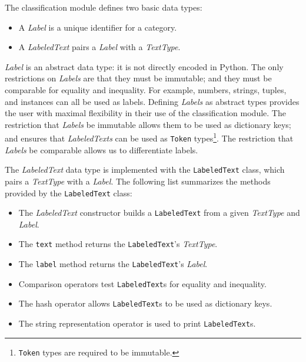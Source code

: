 \documentclass[12pt]{article}
\begin{document}
    The classification module defines two basic data types:

    \begin{itemize}

      \item A \textit{Label} is a unique identifier for a category.

      \item A \textit{LabeledText} pairs a \textit{Label} with a
      \textit{TextType}.

    \end{itemize}

    \textit{Label} is an abstract data type: it is not directly
    encoded in Python.  The only restrictions on \textit{Labels} are
    that they must be immutable; and they must be comparable for
    equality and inequality.  For example, numbers, strings, tuples,
    and instances can all be used as labels.  Defining \textit{Labels}
    as abstract types provides the user with maximal flexibility in
    their use of the classification module.  The restriction that
    \textit{Labels} be immutable allows them to be used as dictionary
    keys; and ensures that \textit{LabeledTexts} can be used as
    \texttt{Token} types\footnote{\texttt{Token} types are required to
    be immutable.}.  The restriction that \textit{Labels} be
    comparable allows us to differentiate labels.

    The \textit{LabeledText} data type is implemented with the
    \texttt{LabeledText} class, which pairs a \textit{TextType} with
    a \textit{Label}.  The following list summarizes the methods
    provided by the \texttt{LabeledText} class:

    \begin{itemize}

      \item The \textit{LabeledText} constructor builds a
      \texttt{LabeledText} from a given \textit{TextType} and
      \textit{Label}.

      \item The \texttt{text} method returns the
      \texttt{LabeledText}'s \textit{TextType}.

      \item The \texttt{label} method returns the
      \texttt{LabeledText}'s \textit{Label}.

      \item Comparison operators test \texttt{LabeledText}s for
      equality and inequality.

      \item The hash operator allows \texttt{LabeledText}s to be used
      as dictionary keys.

      \item The string representation operator is used to print
      \texttt{LabeledText}s.

    \end{itemize}
\end{document}
